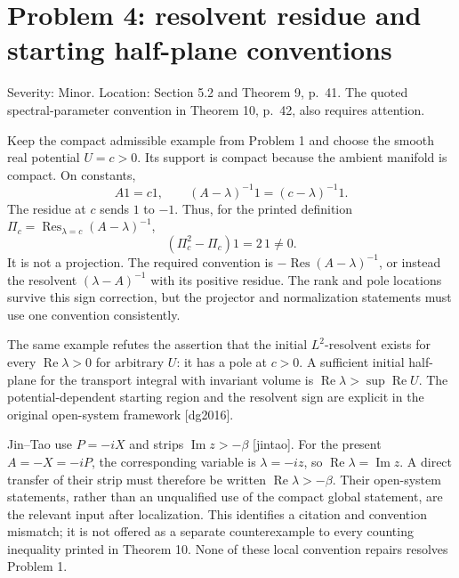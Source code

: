 \documentclass[10pt]{article}
\begin{document}
\section*{Problem 4: resolvent residue and starting half-plane conventions}
Severity: Minor. Location: Section 5.2 and Theorem 9, p. 41. The quoted spectral-parameter convention in Theorem 10, p. 42, also requires attention.\par
Keep the compact admissible example from Problem 1 and choose the smooth real potential \(U=c>0\). Its support is compact because the ambient manifold is compact. On constants, \[A1=c1,\qquad (A-\lambda)^{-1}1=(c-\lambda)^{-1}1.\] The residue at \(c\) sends \(1\) to \(-1\). Thus, for the printed definition \(\Pi_c=\operatorname{Res}_{\lambda=c}(A-\lambda)^{-1}\), \[(\Pi_c^2-\Pi_c)1=2\,1\ne0.\] It is not a projection. The required convention is \(-\operatorname{Res}(A-\lambda)^{-1}\), or instead the resolvent \((\lambda-A)^{-1}\) with its positive residue. The rank and pole locations survive this sign correction, but the projector and normalization statements must use one convention consistently.\par
The same example refutes the assertion that the initial \(L^2\)-resolvent exists for every \(\operatorname{Re}\lambda>0\) for arbitrary \(U\): it has a pole at \(c>0\). A sufficient initial half-plane for the transport integral with invariant volume is \(\operatorname{Re}\lambda>\sup\operatorname{Re}U\). The potential-dependent starting region and the resolvent sign are explicit in the original open-system framework [dg2016].\par
Jin–Tao use \(P=-iX\) and strips \(\operatorname{Im}z>-\beta\) [jintao]. For the present \(A=-X=-iP\), the corresponding variable is \(\lambda=-iz\), so \(\operatorname{Re}\lambda=\operatorname{Im}z\). A direct transfer of their strip must therefore be written \(\operatorname{Re}\lambda>-\beta\). Their open-system statements, rather than an unqualified use of the compact global statement, are the relevant input after localization. This identifies a citation and convention mismatch; it is not offered as a separate counterexample to every counting inequality printed in Theorem 10. None of these local convention repairs resolves Problem 1.\par
\end{document}
